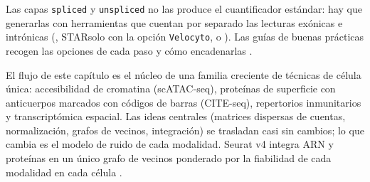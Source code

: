 Las capas \texttt{spliced} y \texttt{unspliced} no las produce el cuantificador estándar: hay que generarlas con herramientas que cuentan por separado las lecturas exónicas e intrónicas (, STARsolo con la opción \texttt{Velocyto}, o ). Las guías de buenas prácticas recogen las opciones de cada paso y cómo encadenarlas \parencite{c12-heumos2023}.

\begin{profundizacion}
El flujo de este capítulo es el núcleo de una familia creciente de técnicas de célula única: accesibilidad de cromatina (scATAC-seq), proteínas de superficie con anticuerpos marcados con códigos de barras (CITE-seq), repertorios inmunitarios y transcriptómica espacial. Las ideas centrales (matrices dispersas de cuentas, normalización, grafos de vecinos, integración) se trasladan casi sin cambios; lo que cambia es el modelo de ruido de cada modalidad. Seurat v4 integra ARN y proteínas en un único grafo de vecinos ponderado por la fiabilidad de cada modalidad en cada célula \parencite{c12-hao2021}.
\end{profundizacion}

